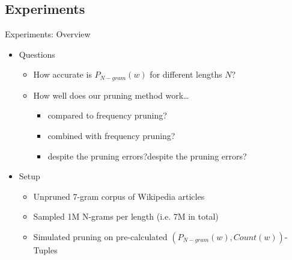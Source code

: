 \documentclass[16:9,en,navbarinfooter]{sdqbeamer}
\begin{document}
\subsection{Experiments}
\begin{frame}{Experiments: Overview}
    \begin{itemize}
        \item Questions
    \begin{itemize}
        \item How accurate is $P_{N-gram}(w)$ for different lengths $N$?
    \item How well does our pruning method work\ldots
        \begin{itemize}
        \item compared to frequency pruning?
        \item combined with frequency pruning?
        \item despite the pruning errors?despite the pruning errors?
        \end{itemize}
    \end{itemize}
    \item Setup
        \begin{itemize}
            \item Unpruned 7-gram corpus of Wikipedia articles
            \item Sampled 1M N-grams per length (i.e. 7M in total)
            \item Simulated pruning on pre-calculated 
                $(P_{N-gram}(w), Count(w))$-Tuples
        \end{itemize}
    \end{itemize}
\end{frame}
\end{document}
